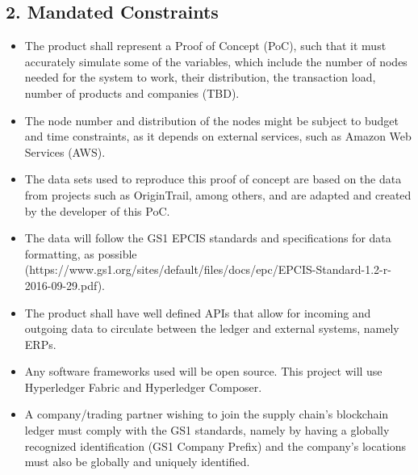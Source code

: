 \subsection*{2. Mandated Constraints}
    \begin{itemize}
		\item The product shall represent a Proof of Concept (PoC), such that it must accurately simulate some of the variables, which include the number of nodes needed for the system to work, their distribution, the transaction load, number of products and companies (TBD).
		\item The node number and distribution of the nodes might be subject to budget and time constraints, as it depends on external services, such as Amazon Web Services (AWS).
		\item The data sets used to reproduce this proof of concept are based on the data from projects such as OriginTrail, among others, and are adapted and created by the developer of this PoC.
		\item The data will follow the GS1 EPCIS standards and specifications for data formatting, as possible (https://www.gs1.org/sites/default/files/docs/epc/EPCIS-Standard-1.2-r-2016-09-29.pdf).
		\item The product shall have well defined APIs that allow for incoming and outgoing data to circulate between the ledger and external systems, namely ERPs.
		\item Any software frameworks used will be open source. This project will use Hyperledger Fabric and Hyperledger Composer.
		\item A company/trading partner wishing to join the supply chain's blockchain ledger must comply with the GS1 standards, namely by having a globally recognized identification (GS1 Company Prefix) and the company's locations must also be globally and uniquely identified.
        \end{itemize}
        

